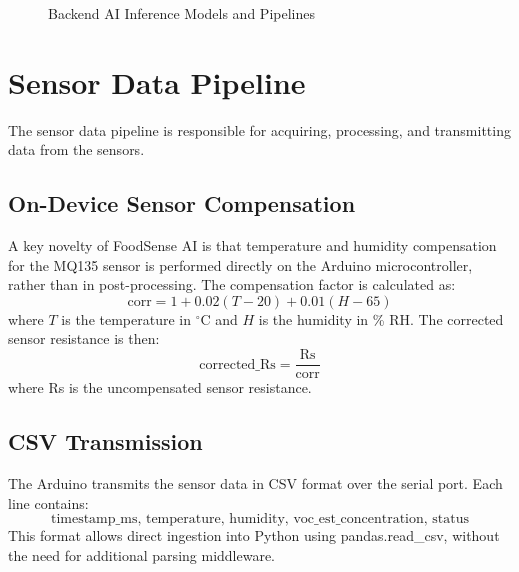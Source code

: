 \begin{figure}[H]
\caption{Backend AI Inference Models and Pipelines}
\label{fig:ai_pipelines}
\end{figure}

\section{Sensor Data Pipeline}
The sensor data pipeline is responsible for acquiring, processing, and transmitting data from the sensors.

\subsection{On-Device Sensor Compensation}
A key novelty of FoodSense AI is that temperature and humidity compensation for the MQ135 sensor is performed directly on the Arduino microcontroller, rather than in post-processing. The compensation factor is calculated as:
\[
\text{corr} = 1 + 0.02(T - 20) + 0.01(H - 65)
\]
where \(T\) is the temperature in $^\circ$C and \(H\) is the humidity in \% RH. The corrected sensor resistance is then:
\[
\text{corrected\_Rs} = \frac{\text{Rs}}{\text{corr}}
\]
where Rs is the uncompensated sensor resistance.

\subsection{CSV Transmission}
The Arduino transmits the sensor data in CSV format over the serial port. Each line contains:
\[
\text{timestamp\_ms, temperature, humidity, voc\_est\_concentration, status}
\]
This format allows direct ingestion into Python using pandas.read\_csv, without the need for additional parsing middleware.

